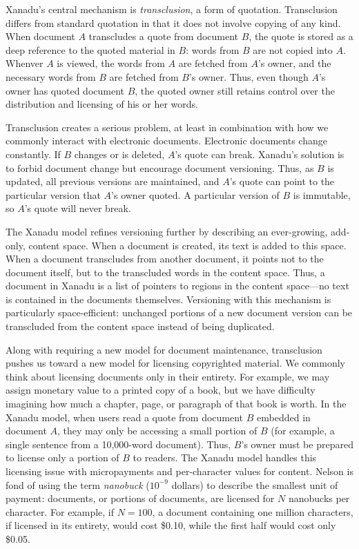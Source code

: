 \documentclass{acm_proc_article-sp}
\begin{document}
Xanadu's central mechanism is {\it transclusion}, a form of quotation.  
Transclusion differs from standard quotation in that it does not involve copying of any kind.  
When document $A$ transcludes a quote from document $B$, the quote is stored as a deep reference to the quoted material in $B$:  words from $B$ are not copied into $A$. 
Whenver $A$ is viewed, the words from $A$ are fetched from $A$'s owner, and the necessary words from $B$ are fetched from $B$'s owner.
Thus, even though $A$'s owner has quoted document $B$, the quoted owner still retains control over the distribution and licensing of his or her words.

Transclusion creates a serious problem, at least in combination with how we commonly interact with electronic documents.
Electronic documents change constantly.
If $B$ changes or is deleted, $A$'s quote can break.
Xanadu's solution is to forbid document change but encourage document versioning.
Thus, as $B$ is updated, all previous versions are maintained, and $A$'s quote can point to the particular version that $A$'s owner quoted.
A particular version of $B$ is immutable, so $A$'s quote will never break.

The Xanadu model refines versioning further by describing an ever-growing, add-only, content space.  
When a document is created, its text is added to this space.
When a document transcludes from another document, it points not to the document itself, but to the transcluded words in the content space.
Thus, a document in Xanadu is a list of pointers to regions in the content space---no text is contained in the documents themselves.
Versioning with this mechanism is particularly space-efficient:  unchanged portions of a new document version can be transcluded from the content space instead of being duplicated.

Along with requiring a new model for document maintenance, transclusion pushes us toward a new model for licensing copyrighted material.
We commonly think about licensing documents only in their entirety.
For example, we may assign monetary value to a printed copy of a book, but we have difficulty imagining how much a chapter, page, or paragraph of that book is worth.
In the Xanadu model, when users read a quote from document $B$ embedded in document $A$, they may only be accessing a small portion of $B$ (for example, a single sentence from a 10,000-word document).
Thus, $B$'s owner must be prepared to license only a portion of $B$ to readers.
The Xanadu model handles this licensing issue with micropayments and per-character values for content.
Nelson is fond of using the term {\it nanobuck} ($10^{-9}$ dollars) to describe the smallest unit of payment:  documents, or portions of documents, are licensed for $N$ nanobucks per character.
For example, if $N=100$, a document containing one million characters, if licensed in its entirety, would cost \$0.10, while the first half would cost only \$0.05.
\end{document}
